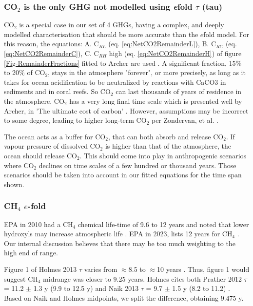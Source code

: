 \documentclass{article}
\begin{document}
\subsubsection{CO$_2$ is the only GHG not modelled using \emph{e}fold $\tau$ (tau)} 
CO$_2$ is a special case in our set of 4 GHGs, having a complex, and deeply modelled characterisation that should be more accurate than the $e$fold model. For this reason, the equations:  A. C$_{RL}$ (eq. \ref{eq:NetCO2RemainderL}), B. C$_{RC}$ (eq. \ref{eq:NetCO2RemainderC}), C. C$_{RH}$ high (eq.  \ref{eq:NetCO2RemainderH}) of figure \ref{Fig-RemainderFractions} fitted to Archer are used \cite{Archer2009AtmosphericLifetimeOfCO2}. A significant fraction, 15\% to 20\% of CO$_2$, stays in the atmosphere "forever", or more precisely, as long as it takes for ocean acidification to be neutralized by reactions with CaCO3 in sediments and in coral reefs. So CO$_2$ can last thousands of years of residence in the atmosphere. CO$_2$ has a very long final time scale which is presented well by Archer, in 'The ultimate cost of carbon' \cite{Archer2020UltimateCostofCarbon}. However, assumptions may be incorrect to some degree, leading to higher long-term  CO$_2$ per Zondervan, et al. \cite{Zondervan2023RockCarbonCO2releaseOffsetsSilicateWeatheringSink}.

The ocean acts as a buffer for CO$_2$, that can both absorb and release CO$_2$. If vapour pressure of dissolved CO$_2$ is higher than that of the atmosphere, the ocean should release CO$_2$. This should come into play in anthropogenic scenarios where CO$_2$ declines on time scales of a few hundred or thousand years. Those scenarios should be taken into account in our fitted equations for the time span shown.

\subsubsection{CH$_4$ $e$-fold}
\label{CH4_efold}
 EPA in 2010 had a CH$_4$ chemical life-time of 9.6 to 12 years and noted that lower hydroxyls may increase atmospheric life \cite{EPA2010CH4_N2O}. EPA in 2023, lists 12 years for CH$_4$ \cite{EPA2023CH4_N2O}. Our internal discussion believes that there may be too much weighting to the high end of range. 
 
 Figure 1 of Holmes 2013 $\tau$ varies from $\approx$8.5 to $\approx$10 years \cite{Holmes2013FutureCH4_OH}. Thus, figure 1 would suggest CH$_4$ midrange was closer to 9.25 years. Holmes cites both Prather 2012 $\tau$ = 11.2 $\pm$ 1.3 y (9.9 to 12.5 y) \cite{Prather2012GHGreactive} and Naik 2013 $\tau$ = 9.7 $\pm$ 1.5 y (8.2 to 11.2) \cite{Naik2013hydroxylCH4lifetime}. Based on Naik and Holmes midpoints, we split the difference, obtaining 9.475 y.
\end{document}
